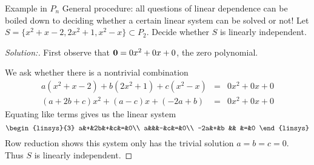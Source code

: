 \begin{frame}{Example in $P_n$}
\alert{General procedure:} all questions of linear dependence can be boiled down to deciding whether a certain linear system can be solved or not!
\bspace
Let $S=\{x^2+x-2, 2x^2+1, x^2-x\}\subset P_2$. Decide whether $S$ is linearly independent. 
\pause
\begin{proof}[Solution:] 
First observe that ${\mathbf 0}=0x^2+0x+0$, the zero polynomial. 

We ask whether there is a \alert{nontrivial} combination
\begin{eqnarray*}
a(x^2+x-2)+b(2x^2+1)+c(x^2-x)&=&0x^2+0x+0\\
(a+2b+c)x^2+(a-c)x+(-2a+b)&=&0x^2+0x+0
\end{eqnarray*}
\pause Equating like terms gives us the linear system
\[
\begin{linsys}{3}
a&+&2b&+&c&=&0\\
a&&&-&c&=&0\\
-2a&+&b && &=&0
\end{linsys}
\]
\pause Row reduction shows this system only has the trivial solution $a=b=c=0$. Thus $S$ is \alert{linearly independent}.
\end{proof}
\end{frame}
